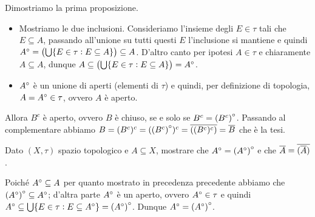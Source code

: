 \documentclass[a4paper]{article}\par \usepackage{style}\par
\begin{document}
Dimostriamo la prima proposizione.
\begin{itemize}[label = $ \Rightarrow $]
\item Mostriamo le due inclusioni. Consideriamo l'insieme degli $ E \in \tau $ tali che $ E \subseteq A $, passando all'unione su tutti questi $ E $ l'inclusione si mantiene e quindi $ {A}^{\circ} = \left(\bigcup \{E \in \tau : E \subseteq A\}\right) \subseteq A $. D'altro canto per ipotesi $ A \in \tau $ e chiaramente $ A \subseteq A $, dunque $ A \subseteq \left(\bigcup \{E \in \tau : E \subseteq A\}\right) = {A}^{\circ}$.
\end{itemize}
\begin{itemize}[label = $ \Leftarrow $]
\item  $ {A}^{\circ} $ è un unione di aperti (elementi di $ \tau $) e quindi, per definizione di topologia, $ A = {A}^{\circ} \in \tau $, ovvero $ A $ è aperto.
\end{itemize}
Allora $ B^c $ è aperto, ovvero $ B $ è chiuso, se e solo se $ B^c = {(B^c)}^{\circ} $. Passando al complementare abbiamo $ B = (B^c)^c = ({(B^c)}^{\circ})^c = \overline{((B^c)^c)} = \overline{B} $ che è la tesi.\par \begin{es}
  Dato $ (X, \tau) $ spazio topologico e $ A \subseteq X $, mostrare che $ {A}^{\circ} = {({A}^{\circ})}^{\circ} $ e che $ \overline{A} = \overline{(\overline{A})} $.
\end{es}\par Poiché $ {A}^{\circ} \subseteq A $ per quanto mostrato in precedenza precedente abbiamo che $ {({A}^{\circ})}^{\circ} \subseteq {A}^{\circ} $; d'altra parte $ {A}^{\circ} $ è un aperto, ovvero $ {A}^{\circ} \in \tau $ e quindi $ {A}^{\circ} \subseteq \bigcup \{E \in \tau : E \subseteq {A}^{\circ}\} = {({A}^{\circ})}^{\circ} $. Dunque $ {A}^{\circ} = {({A}^{\circ})}^{\circ} $. \\
\end{document}
